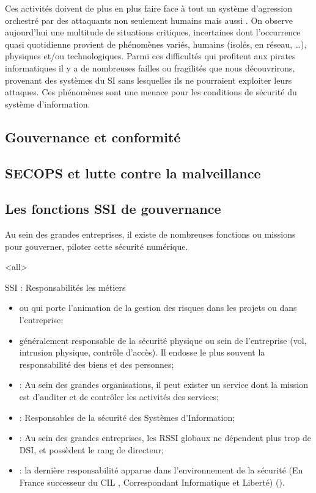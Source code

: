 Ces activités doivent de plus en plus faire face à tout un système d'agression orchestré par des attaquants non seulement humains mais aussi . On observe aujourd'hui une multitude de situations critiques, incertaines dont l'occurrence quasi quotidienne provient de phénomènes variés, humains (isolés, en réseau, …), physiques et/ou technologiques. Parmi ces difficultés qui profitent aux pirates informatiques il y a de nombreuses failles ou fragilités que nous découvrirons, provenant des systèmes du SI sans lesquelles ils ne pourraient exploiter leurs attaques. Ces phénomènes sont une menace pour les conditions de sécurité du système d'information.


\subsection{Gouvernance et conformité}

\utodo

\subsection{SECOPS et lutte contre la malveillance}

\utodo

\subsection{Les fonctions SSI de gouvernance}

Au sein des grandes entreprises, il existe de nombreuses fonctions ou missions pour gouverner, piloter cette sécurité numérique.

\mode<all>{\texframe
{SSI : Responsabilités}
{les métiers}
{
\begin{itemize}
 \item {} ou  qui porte l'animation de la gestion des risques dans les projets ou dans l'entreprise;
\item {} généralement responsable de la sécurité physique ou sein de l'entreprise (vol, intrusion physique, contrôle d'accès). Il endosse le plus souvent la responsabilité des biens et des personnes;
\item {} : Au sein des grandes organisations, il peut exister un service  dont la mission est d'auditer et de contrôler les activités des services;
\item {} : Responsables de la sécurité des Systèmes d'Information;
\item {} : Au sein des grandes entreprises, les RSSI globaux ne dépendent plus trop de DSI, et possèdent le rang de directeur;
\item {} : la dernière responsabilité apparue dans l'environnement de la sécurité (En France successeur du CIL , Correspondant Informatique et Liberté) ().
\end{itemize}
}}%


